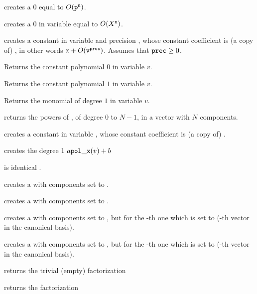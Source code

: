 \label{se:clean}

 creates a $0$  equal to
$O({\tt p}^{\tt n})$.

 creates a $0$  in variable
 equal to $O(X^{\tt n})$.

 creates a constant 
in variable  and precision , whose constant coefficient is
(a copy of) , in other words ${\tt x} + O({\tt v}^{\tt prec})$.
Assumes that ${\tt prec}\geq 0$.

 Returns the constant polynomial $0$ in variable $v$.

 Returns the constant polynomial $1$ in variable $v$.

 Returns the monomial of degree $1$ in variable $v$.

 returns the powers of
, of degree $0$ to $N-1$, in a vector with $N$ components.

 creates a constant  in variable
, whose constant coefficient is (a copy of) .

 creates the degree 1 
$a {\tt pol\_x}(v) + b$

 is identical .

 creates a  with  components set to
.

 creates a  with  components set to
.

 creates a  with  components
set to , but for the -th one which is set to 
(-th vector in the canonical basis).

 creates a  with  components
set to , but for the -th one which is set to 
(-th vector in the canonical basis).

 returns the trivial (empty) factorization

 returns the factorization

